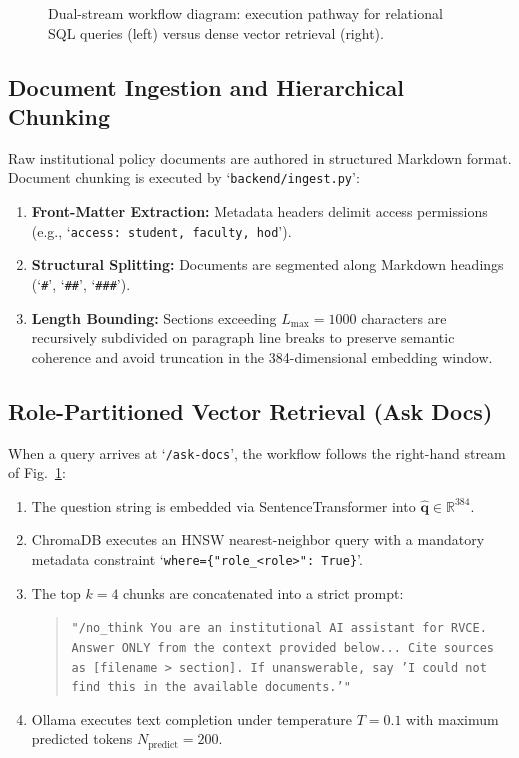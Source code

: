 \documentclass[conference]{IEEEtran}
\begin{document}
\begin{figure}[htbp]
\centering

\caption{Dual-stream workflow diagram: execution pathway for relational SQL queries (left) versus dense vector retrieval (right).}
\label{fig:workflow}
\end{figure}

\subsection{Document Ingestion and Hierarchical Chunking}
Raw institutional policy documents are authored in structured Markdown format. Document chunking is executed by `\texttt{backend/ingest.py}':
\begin{enumerate}
    \item \textbf{Front-Matter Extraction:} Metadata headers delimit access permissions (e.g., `\texttt{access: student, faculty, hod}').
    \item \textbf{Structural Splitting:} Documents are segmented along Markdown headings (`\texttt{\#}', `\texttt{\#\#}', `\texttt{\#\#\#}').
    \item \textbf{Length Bounding:} Sections exceeding $L_{\text{max}} = 1000$ characters are recursively subdivided on paragraph line breaks to preserve semantic coherence and avoid truncation in the 384-dimensional embedding window.
\end{enumerate}

\subsection{Role-Partitioned Vector Retrieval (Ask Docs)}
When a query arrives at `\texttt{/ask-docs}', the workflow follows the right-hand stream of Fig.~\ref{fig:workflow}:
\begin{enumerate}
    \item The question string is embedded via SentenceTransformer into $\hat{\mathbf{q}} \in \mathbb{R}^{384}$.
    \item ChromaDB executes an HNSW nearest-neighbor query with a mandatory metadata constraint `\texttt{where=\{"role\_<role>": True\}}'.
    \item The top $k=4$ chunks are concatenated into a strict prompt:
    \begin{quote}
    \small
    \texttt{"/no\_think You are an institutional AI assistant for RVCE. Answer ONLY from the context provided below... Cite sources as [filename > section]. If unanswerable, say 'I could not find this in the available documents.'"}
    \end{quote}
    \item Ollama executes text completion under temperature $T=0.1$ with maximum predicted tokens $N_{\text{predict}} = 200$.
\end{enumerate}
\end{document}
